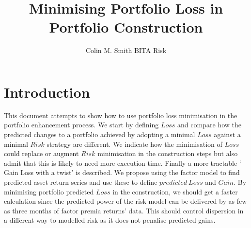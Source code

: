 \documentclass[12pt]{article}
\title{Minimising Portfolio Loss in Portfolio Construction}
\author{Colin M. Smith BITA Risk}
\begin{document}
\maketitle
\tableofcontents
\pagebreak
\doublespacing
\section{Introduction}
This document attempts to show how to use portfolio loss minimisation in the
portfolio enhancement process. We start by defining $Loss$ and compare how
the predicted changes to a portfolio achieved by adopting a minimal $Loss$ against a minimal $Risk$ strategy are different. 
We indicate how the minimisation of
$Loss$ could replace or augment $Risk$ minimisation in the construction steps but also admit
that this is likely to need more execution time.
Finally a more tractable $`$Gain Loss with a twist' is described. We propose using
the factor model to find predicted asset return series and use these to define $predicted\ Loss$ and $Gain$. 
By minimising portfolio predicted $Loss$ in the construction, we should get a faster calculation since 
the predicted power of the risk model can be delivered by as few as three months of factor premia returns' data.
This should control dispersion in a different way to modelled risk as it does not penalise predicted gains.
\end{document}
